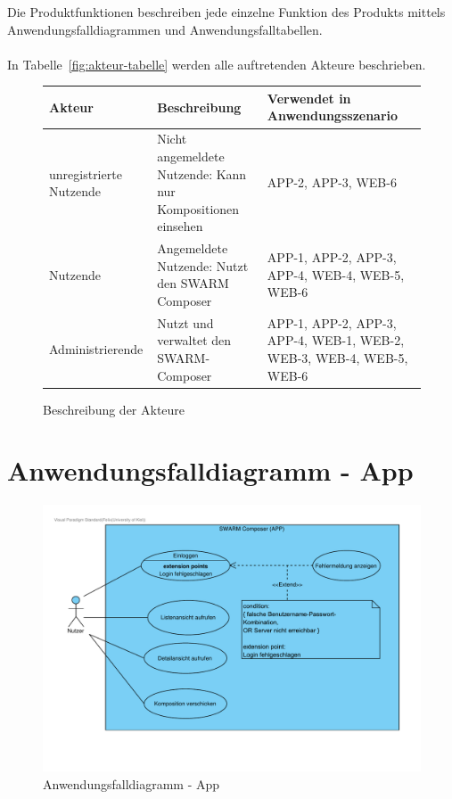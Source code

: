 Die Produktfunktionen beschreiben jede einzelne Funktion des Produkts mittels Anwendungsfalldiagrammen und Anwendungsfalltabellen.
\\\\
In  Tabelle~\autoref{fig:akteur-tabelle} werden alle auftretenden Akteure beschrieben.


\begin{figure}[h]
	\centering

	\begin{tabularx}{\textwidth}{ p{} | p{} | X }
		\textbf{Akteur} & \textbf{Beschreibung} & \textbf{Verwendet in Anwendungsszenario} \\ \hline
		unregistrierte Nutzende & Nicht angemeldete Nutzende: Kann nur Kompositionen einsehen & APP-2, APP-3, WEB-6
		\\ \hline Nutzende & Angemeldete Nutzende: Nutzt den SWARM Composer & APP-1, APP-2, APP-3, APP-4, WEB-4, WEB-5, WEB-6
		\\ \hline Administrierende & Nutzt und verwaltet den SWARM-Composer & APP-1, APP-2, APP-3, APP-4, WEB-1, WEB-2, WEB-3, WEB-4, WEB-5, WEB-6
	\end{tabularx}

	\caption{Beschreibung der Akteure}
	\label{fig:akteur-tabelle}
\end{figure}


\newpage

\section{Anwendungsfalldiagramm - App}

\begin{figure}[h]
	\centering	
	\includegraphics[width=\textwidth]{img/Produktfunktionen_app}	
	\caption{Anwendungsfalldiagramm - App}
	\label{fig:anwendungsfalldiagramm-app}
\end{figure}

